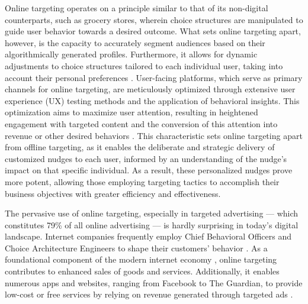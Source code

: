 \documentclass[preprint]{acmart}
\begin{document}
Online targeting operates on a principle similar to that of its non-digital counterparts, such as grocery stores, wherein choice structures are manipulated to guide user behavior towards a desired outcome. What sets online targeting apart, however, is the capacity to accurately segment audiences based on their algorithmically generated profiles. Furthermore, it allows for dynamic adjustments to choice structures tailored to each individual user, taking into account their personal preferences \cite{susser2019}. User-facing platforms, which serve as primary channels for online targeting, are meticulously optimized through extensive user experience (UX) testing methods and the application of behavioral insights. This optimization aims to maximize user attention, resulting in heightened engagement with targeted content and the conversion of this attention into revenue or other desired behaviors \cite{bakir}. This characteristic sets online targeting apart from offline targeting, as it enables the deliberate and strategic delivery of customized nudges to each user, informed by an understanding of the nudge's impact on that specific individual. As a result, these personalized nudges prove more potent, allowing those employing targeting tactics to accomplish their business objectives with greater efficiency and effectiveness.



The pervasive use of online targeting, especially in targeted advertising --- which constitutes 79\% of all online advertising \cite{miller2018} --- is hardly surprising in today's digital landscape. Internet companies frequently employ Chief Behavioral Officers and Choice Architecture Engineers to shape their customers' behavior \cite{Kirchhof2021}. As a foundational component of the modern internet economy \cite{Beer2019}, online targeting contributes to enhanced sales of goods and services. Additionally, it enables numerous apps and websites, ranging from Facebook to The Guardian, to provide low-cost or free services by relying on revenue generated through targeted ads \cite{johnson2022}.
\end{document}
